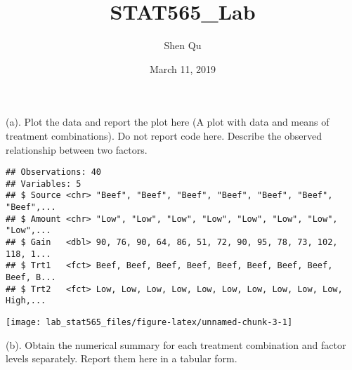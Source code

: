 \documentclass[]{article}
\title{STAT565\_Lab}
\author{Shen Qu}
\date{March 11, 2019}
\begin{document}
\maketitle

(a).
\textcolor[rgb]{0.5,0.5,0.5}{Plot the data and report the plot here (A plot with data and means of treatment combinations). Do not report code here. Describe the observed relationship between two factors.}

\begin{verbatim}
## Observations: 40
## Variables: 5
## $ Source <chr> "Beef", "Beef", "Beef", "Beef", "Beef", "Beef", "Beef",...
## $ Amount <chr> "Low", "Low", "Low", "Low", "Low", "Low", "Low", "Low",...
## $ Gain   <dbl> 90, 76, 90, 64, 86, 51, 72, 90, 95, 78, 73, 102, 118, 1...
## $ Trt1   <fct> Beef, Beef, Beef, Beef, Beef, Beef, Beef, Beef, Beef, B...
## $ Trt2   <fct> Low, Low, Low, Low, Low, Low, Low, Low, Low, Low, High,...
\end{verbatim}

\texttt{[image: lab\_stat565\_files/figure-latex/unnamed-chunk-3-1]}

(b).
\textcolor[rgb]{0.5,0.5,0.5}{Obtain the numerical summary for each treatment combination and factor levels separately. Report them here in a tabular form.}
\end{document}
